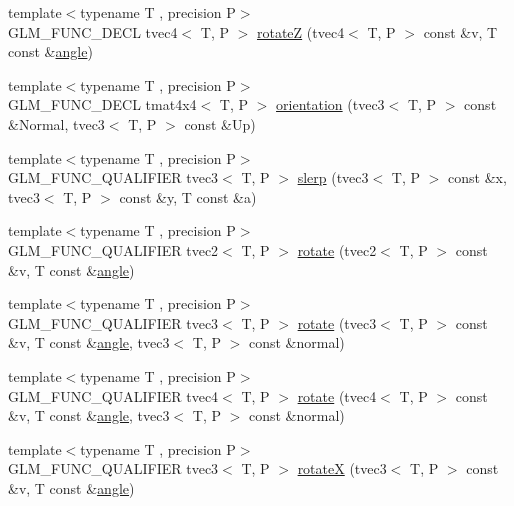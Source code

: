 \begin{DoxyCompactItemize}
\item 
{\footnotesize template$<$typename T , precision P$>$ }\\G\+L\+M\+\_\+\+F\+U\+N\+C\+\_\+\+D\+E\+C\+L tvec4$<$ T, P $>$ \hyperlink{group__gtx__rotate__vector_ga034e5d197ab4bd8685624bc2cf16e586}{rotate\+Z} (tvec4$<$ T, P $>$ const \&v, T const \&\hyperlink{group__gtc__quaternion_gad4a4448baedb198b2b1e7880d2544dc9}{angle})
\item 
{\footnotesize template$<$typename T , precision P$>$ }\\G\+L\+M\+\_\+\+F\+U\+N\+C\+\_\+\+D\+E\+C\+L tmat4x4$<$ T, P $>$ \hyperlink{group__gtx__rotate__vector_ga49b4d082305cdfcfe0a5c184f684a902}{orientation} (tvec3$<$ T, P $>$ const \&Normal, tvec3$<$ T, P $>$ const \&Up)
\item 
{\footnotesize template$<$typename T , precision P$>$ }\\G\+L\+M\+\_\+\+F\+U\+N\+C\+\_\+\+Q\+U\+A\+L\+I\+F\+I\+E\+R tvec3$<$ T, P $>$ \hyperlink{group__gtx__rotate__vector_gafc9ab3101c3f3799f3d5d6d9d3baac09}{slerp} (tvec3$<$ T, P $>$ const \&x, tvec3$<$ T, P $>$ const \&y, T const \&a)
\item 
{\footnotesize template$<$typename T , precision P$>$ }\\G\+L\+M\+\_\+\+F\+U\+N\+C\+\_\+\+Q\+U\+A\+L\+I\+F\+I\+E\+R tvec2$<$ T, P $>$ \hyperlink{group__gtx__rotate__vector_ga9bff444fb191e2e089a906b899cd033d}{rotate} (tvec2$<$ T, P $>$ const \&v, T const \&\hyperlink{group__gtc__quaternion_gad4a4448baedb198b2b1e7880d2544dc9}{angle})
\item 
{\footnotesize template$<$typename T , precision P$>$ }\\G\+L\+M\+\_\+\+F\+U\+N\+C\+\_\+\+Q\+U\+A\+L\+I\+F\+I\+E\+R tvec3$<$ T, P $>$ \hyperlink{group__gtx__rotate__vector_ga526b6f8995bc0946aa1a04e9297de7c6}{rotate} (tvec3$<$ T, P $>$ const \&v, T const \&\hyperlink{group__gtc__quaternion_gad4a4448baedb198b2b1e7880d2544dc9}{angle}, tvec3$<$ T, P $>$ const \&normal)
\item 
{\footnotesize template$<$typename T , precision P$>$ }\\G\+L\+M\+\_\+\+F\+U\+N\+C\+\_\+\+Q\+U\+A\+L\+I\+F\+I\+E\+R tvec4$<$ T, P $>$ \hyperlink{group__gtx__rotate__vector_gaf4d59dd2f668f9ffb38048055d1316bd}{rotate} (tvec4$<$ T, P $>$ const \&v, T const \&\hyperlink{group__gtc__quaternion_gad4a4448baedb198b2b1e7880d2544dc9}{angle}, tvec3$<$ T, P $>$ const \&normal)
\item 
{\footnotesize template$<$typename T , precision P$>$ }\\G\+L\+M\+\_\+\+F\+U\+N\+C\+\_\+\+Q\+U\+A\+L\+I\+F\+I\+E\+R tvec3$<$ T, P $>$ \hyperlink{group__gtx__rotate__vector_ga0c2dc9f8507bffcbb957db9818b18508}{rotate\+X} (tvec3$<$ T, P $>$ const \&v, T const \&\hyperlink{group__gtc__quaternion_gad4a4448baedb198b2b1e7880d2544dc9}{angle})

\end{DoxyCompactItemize}
